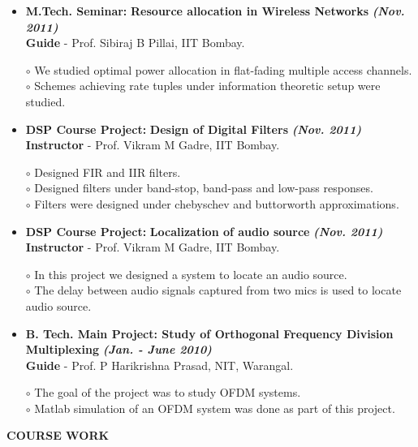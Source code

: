 \documentclass[a4paper,10pt]{article}
\begin{document}
\begin{itemize}
 \item \textbf{M.Tech. Seminar:} \textbf{Resource allocation in Wireless Networks}  \textbf \emph{(Nov. 2011)}\\
        {\textbf{Guide} - Prof. Sibiraj B Pillai, IIT Bombay.   }

      $\circ$ We studied optimal power allocation in flat-fading multiple access channels. \\
      $\circ$ Schemes achieving rate tuples under information theoretic setup were studied.
             
 \item \textbf{DSP Course Project:} \textbf{Design of Digital Filters} \textbf \emph{(Nov. 2011)}\\
	{\textbf{Instructor} - Prof. Vikram M Gadre, IIT Bombay. }
	
	$\circ$ Designed FIR and IIR filters. \\
	$\circ$ Designed filters under band-stop, band-pass and low-pass responses. \\
	$\circ$ Filters were designed under chebyschev and buttorworth approximations.
	
 \item \textbf{DSP Course Project:} \textbf{Localization of audio source} \textbf \emph{(Nov. 2011)}\\
	{\textbf{Instructor} - Prof. Vikram M Gadre, IIT Bombay. }
	
	$\circ$ In this project we designed a system to locate an audio source. \\
	$\circ$ The delay between audio signals captured from two mics is used to locate audio source.

  \item \textbf{{B. Tech. Main Project}: Study of Orthogonal Frequency Division Multiplexing}  \textbf \emph{(Jan. - June 2010)}\\
        {\textbf{Guide} - Prof. P Harikrishna Prasad, NIT, Warangal. }
        
$\circ$ The goal of the project was to study OFDM systems. \\
$\circ$ Matlab simulation of an OFDM system was done as part of this project.

 \end{itemize}
 
 \colorbox{titleColor}{\parbox{6.5in}{\textbf{COURSE WORK}}}
\end{document}
